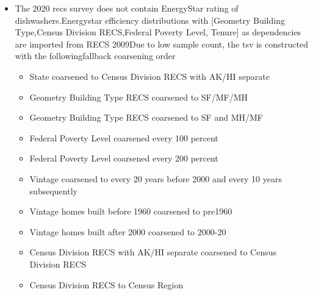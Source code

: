 \begin{itemize}
\item The 2020 recs survey does not contain EnergyStar rating of dishwashers.Energystar efficiency distributions with [Geometry Building Type,Census Division RECS,Federal Poverty Level, Tenure] as dependencies are imported from RECS 2009Due to low sample count, the tsv is constructed with the followingfallback coarsening order
  \begin{itemize}
  \item State coarsened to Census Division RECS with AK/HI separate
  \item Geometry Building Type RECS coarsened to SF/MF/MH
  \item Geometry Building Type RECS coarsened to SF and MH/MF
  \item Federal Poverty Level coarsened every 100 percent
  \item Federal Poverty Level coarsened every 200 percent
  \item Vintage coarsened to every 20 years before 2000 and every 10 years subsequently
  \item Vintage homes built before 1960 coarsened to pre1960
  \item Vintage homes built after 2000 coarsened to 2000-20
  \item Census Division RECS with AK/HI separate coarsened to Census Division RECS
  \item Census Division RECS to Census Region
  \end{itemize}
\end{itemize}
